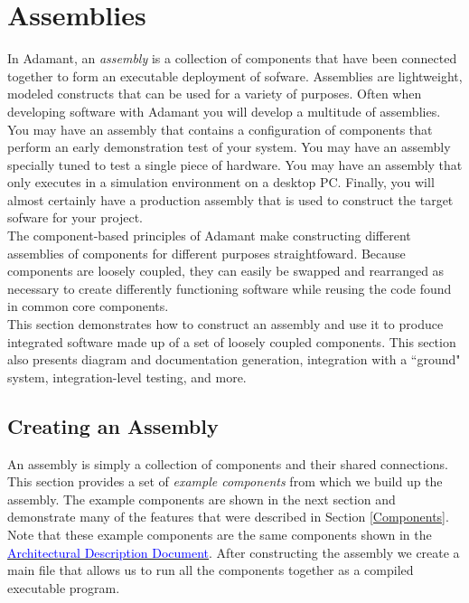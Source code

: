 \newpage
\section{Assemblies} \label{Assemblies}

In Adamant, an \textit{assembly} is a collection of components that have been connected together to form an executable deployment of sofware. Assemblies are lightweight, modeled constructs that can be used for a variety of purposes. Often when developing software with Adamant you will develop a multitude of assemblies. You may have an assembly that contains a configuration of components that perform an early demonstration test of your system. You may have an assembly specially tuned to test a single piece of hardware. You may have an assembly that only executes in a simulation environment on a desktop PC. Finally, you will almost certainly have a production assembly that is used to construct the target sofware for your project. \\

The component-based principles of Adamant make constructing different assemblies of components for different purposes straightfoward. Because components are loosely coupled, they can easily be swapped and rearranged as necessary to create differently functioning software while reusing the code found in common core components. \\

This section demonstrates how to construct an assembly and use it to produce integrated software made up of a set of loosely coupled components. This section also presents diagram and documentation generation, integration with a ``ground" system, integration-level testing, and more.

\subsection{Creating an Assembly}

An assembly is simply a collection of components and their shared connections. This section provides a set of \textit{example components} from which we build up the assembly. The example components are shown in the next section and demonstrate many of the features that were described in Section \ref{Components}. Note that these example components are the same components shown in the \href{https://github.com/lasp/adamant/blob/main/doc/architecture_description_document/architecture_description_document.pdf}{\textcolor{blue}{Architectural Description Document}}. After constructing the assembly we create a main file that allows us to run all the components together as a compiled executable program.

